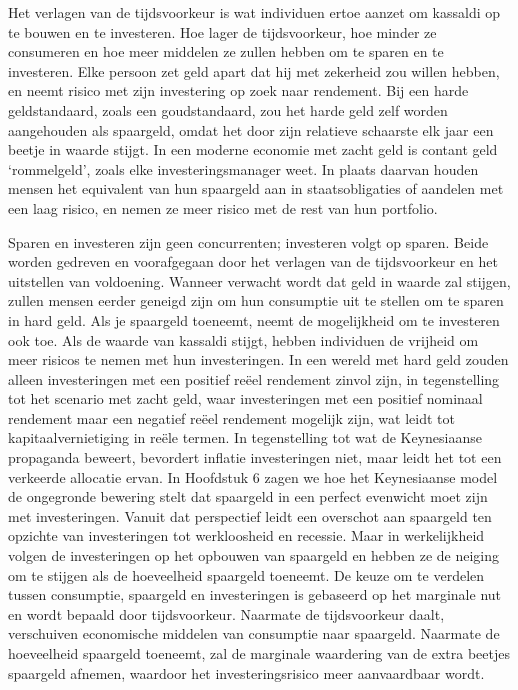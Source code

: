 \documentclass[
  a5paper,
  smalldemyvopaper,11pt,twoside,onecolumn,openright,extrafontsizes,
hidelinks]{memoir}
\begin{document}
Het verlagen van de tijdsvoorkeur is wat individuen ertoe aanzet om
kassaldi op te bouwen en te investeren. Hoe lager de tijdsvoorkeur, hoe
minder ze consumeren en hoe meer middelen ze zullen hebben om te sparen
en te investeren. Elke persoon zet geld apart dat hij met zekerheid zou
willen hebben, en neemt risico met zijn investering op zoek naar
rendement. Bij een harde geldstandaard, zoals een goudstandaard, zou het
harde geld zelf worden aangehouden als spaargeld, omdat het door zijn
relatieve schaarste elk jaar een beetje in waarde stijgt. In een moderne
economie met zacht geld is contant geld `rommelgeld', zoals elke
investeringsmanager weet. In plaats daarvan houden mensen het equivalent
van hun spaargeld aan in staatsobligaties of aandelen met een laag
risico, en nemen ze meer risico met de rest van hun portfolio.

Sparen en investeren zijn geen concurrenten; investeren volgt op sparen.
Beide worden gedreven en voorafgegaan door het verlagen van de
tijdsvoorkeur en het uitstellen van voldoening. Wanneer verwacht wordt
dat geld in waarde zal stijgen, zullen mensen eerder geneigd zijn om hun
consumptie uit te stellen om te sparen in hard geld. Als je spaargeld
toeneemt, neemt de mogelijkheid om te investeren ook toe. Als de waarde
van kassaldi stijgt, hebben individuen de vrijheid om meer risicos te
nemen met hun investeringen. In een wereld met hard geld zouden alleen
investeringen met een positief reëel rendement zinvol zijn, in
tegenstelling tot het scenario met zacht geld, waar investeringen met
een positief nominaal rendement maar een negatief reëel rendement
mogelijk zijn, wat leidt tot kapitaalvernietiging in reële termen. In
tegenstelling tot wat de Keynesiaanse propaganda beweert, bevordert
inflatie investeringen niet, maar leidt het tot een verkeerde allocatie
ervan. In Hoofdstuk 6 zagen we hoe het Keynesiaanse model de ongegronde
bewering stelt dat spaargeld in een perfect evenwicht moet zijn met
investeringen. Vanuit dat perspectief leidt een overschot aan spaargeld
ten opzichte van investeringen tot werkloosheid en recessie. Maar in
werkelijkheid volgen de investeringen op het opbouwen van spaargeld en
hebben ze de neiging om te stijgen als de hoeveelheid spaargeld
toeneemt. De keuze om te verdelen tussen consumptie, spaargeld en
investeringen is gebaseerd op het marginale nut en wordt bepaald door
tijdsvoorkeur. Naarmate de tijdsvoorkeur daalt, verschuiven economische
middelen van consumptie naar spaargeld. Naarmate de hoeveelheid
spaargeld toeneemt, zal de marginale waardering van de extra beetjes
spaargeld afnemen, waardoor het investeringsrisico meer aanvaardbaar
wordt.
\end{document}
